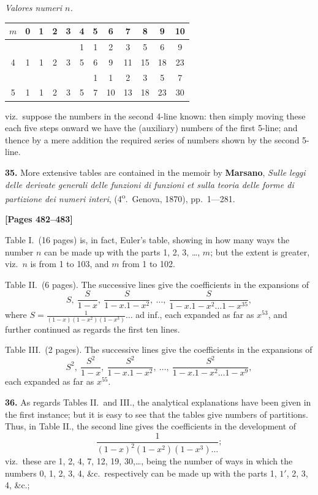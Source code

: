 \documentclass[11pt,a4paper]{book}
\begin{document}
\begin{center}
\textit{Valores numeri $n$.}
\begin{tabular}{c|ccccccccccc}
$m$ & 0 & 1 & 2 & 3 & 4 & 5 & 6 & 7 & 8 & 9 & 10 \\
\hline
 & & & & & 1 & 1 & 2 & 3 & 5 & 6 & 9 \\
4 & 1 & 1 & 2 & 3 & 5 & 6 & 9 & 11 & 15 & 18 & 23 \\
 & & & & & & 1 & 1 & 2 & 3 & 5 & 7 \\
5 & 1 & 1 & 2 & 3 & 5 & 7 & 10 & 13 & 18 & 23 & 30 \\
\end{tabular}
\end{center}

viz.\ suppose the numbers in the second 4-line known: then simply moving these each
five steps onward we have the (auxiliary) numbers of the first 5-line; and thence
by a mere addition the required series of numbers shown by the second 5-line.

\textbf{35.} More extensive tables are contained in the memoir by
\quad\textbf{Marsano}, \textit{Sulle leggi delle derivate generali delle funzioni di funzioni et sulla teoria delle forme di partizione dei numeri interi},
(4\textsuperscript{o}.\ Genova, 1870), pp.\ 1---281.

\newpage
\textbf{[Pages 482--483]}

Table I.\ (16 pages) is, in fact, Euler's table, showing in how many ways the
number $n$ can be made up with the parts 1, 2, 3, \ldots, $m$; but the extent is greater,
viz.\ $n$ is from 1 to 103, and $m$ from 1 to 102.

Table II.\ (6 pages). The successive lines give the coefficients in the expansions of
\[S,\ \frac{S}{1-x},\ \frac{S}{1-x.1-x^{2}},\ \ldots,\ \frac{S}{1-x.1-x^{2}\ldots 1-x^{35}},\]
where $S = \frac{1}{(1-x)(1-x^{2})(1-x^{3})}\ldots$ ad inf.,
each expanded as far as $x^{53}$, and further continued as regards the first ten lines.

Table III.\ (2 pages). The successive lines give the coefficients in the expansions of
\[S^{2},\ \frac{S^{2}}{1-x},\ \frac{S^{2}}{1-x.1-x^{2}},\ \ldots,\ \frac{S^{2}}{1-x.1-x^{2}\ldots 1-x^{9}},\]
each expanded as far as $x^{55}$.

\textbf{36.} As regards Tables II.\ and III., the analytical explanations have been given
in the first instance; but it is easy to see that the tables give numbers of partitions.
Thus, in Table II., the second line gives the coefficients in the development of
\[\frac{1}{(1-x)^{2}(1-x^{2})(1-x^{3})\ldots};\]
viz.\ these are 1, 2, 4, 7, 12, 19, 30,\ldots, being the number of ways in which the
numbers 0, 1, 2, 3, 4, \&c.\ respectively can be made up with the parts 1, $1'$, 2, 3,
4, \&c.;
\end{document}
